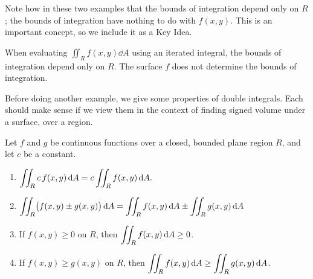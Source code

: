 Note how in these two examples that the bounds of integration depend only on $R$; the bounds of integration have nothing to do with $f(x,y)$. This is an important concept, so we include it  as a Key Idea.

\begin{keyidea}\label{idea:bounds_on_double}%
When evaluating $\iint_Rf(x,y)\dd A$ using an iterated integral, the bounds of integration depend only on $R$. The surface $f$ does not determine the bounds of integration.
\end{keyidea}

Before doing another example, we give some properties of double integrals. Each should make sense if we view them in the context of finding signed volume under a surface, over a region.

\begin{theorem}\label{thm:double_prop}%
Let $f$ and $g$ be continuous functions over a closed, bounded plane region $R$, and let $c$ be a constant.
\begin{enumerate}
	\item $\displaystyle \iint_Rc\,f(x,y)\operatorname{d}\! A = c\iint_Rf(x,y)\operatorname{d}\! A.$
	\item	$\displaystyle \iint_R \bigl(f(x,y)\pm g(x,y)\bigr)\operatorname{d}\! A = \iint_R f(x,y)\operatorname{d}\! A \pm \iint_R g(x,y)\operatorname{d}\! A $
	\item	If $f(x,y)\geq 0$ on $R$, then $\displaystyle \iint_R f(x,y)\operatorname{d}\! A\geq 0$.
	\item	If $f(x,y)\geq g(x,y)$ on $R$, then $\displaystyle \iint_R f(x,y)\operatorname{d}\! A\geq \iint_R g(x,y)\operatorname{d}\! A$.
%
\end{enumerate}
\end{theorem}
